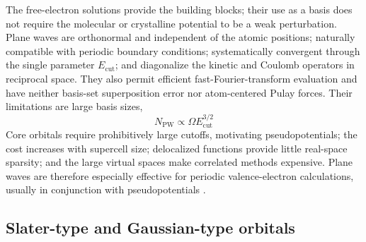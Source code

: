 The free-electron solutions provide the building blocks; their use as a
basis does not require the molecular or crystalline potential to be a weak
perturbation. Plane waves are orthonormal and independent of
the atomic positions; naturally compatible with periodic boundary conditions;
systematically convergent through the single parameter $E_\text{cut}$; and
diagonalize the kinetic and Coulomb operators in reciprocal space. They also
permit efficient fast-Fourier-transform evaluation and have neither basis-set
superposition error nor atom-centered Pulay forces. Their limitations are
large basis sizes,
\begin{equation}
  N_\text{PW}\propto\Omega E_\text{cut}^{3/2}
\end{equation}
Core orbitals require prohibitively large cutoffs, motivating
pseudopotentials; the cost increases with supercell size; delocalized functions
provide little real-space sparsity; and the large virtual spaces make
correlated methods expensive.
Plane waves are therefore especially effective for periodic valence-electron
calculations, usually in conjunction with pseudopotentials \citep{Payne1992}.

\subsection{Slater-type and Gaussian-type orbitals}

